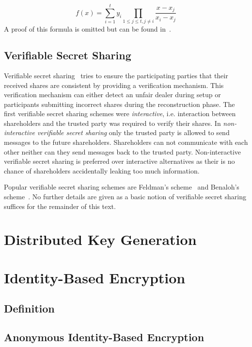 \begin{equation*}
 f \left( x \right) = \sum^t_{i=1}y_i \prod_{1 \leq j \leq t, j \neq i} \frac{x-x_j}{x_i-x_j}
\end{equation*}
A proof of this formula is omitted but can be found in~\cite{site:proofwiki_lagrange}.

\subsection{Verifiable Secret Sharing}
Verifiable secret sharing~\cite{art:ChorGMA85} tries to ensure the participating parties that their received shares are consistent by providing a verification mechanism. This verification mechanism can either detect an unfair dealer during setup or participants submitting incorrect shares during the reconstruction phase. The first verifiable secret sharing schemes were \textit{interactive}, i.e. interaction between shareholders and the trusted party was required to verify their shares. In \textit{non-interactive verifiable secret sharing} only the trusted party is allowed to send messages to the future shareholders. Shareholders can not communicate with each other neither can they send messages back to the trusted party. Non-interactive verifiable secret sharing is preferred over interactive alternatives as their is no chance of shareholders accidentally leaking too much information.

Popular verifiable secret sharing schemes are Feldman's scheme~\cite{art:Feldman87} and Benaloh's scheme~\cite{art:Benaloh86a}. No further details are given as a basic notion of verifiable secret sharing suffices for the remainder of this text.

\section{Distributed Key Generation}

\section{Identity-Based Encryption}

\subsection{Definition}

\subsection{Anonymous Identity-Based Encryption}

